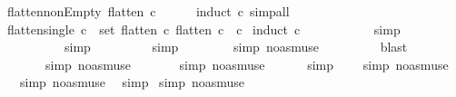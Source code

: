 \begin{isabellebody}
\isanewline
\isanewline
{}\isamarkupfalse%
\ flatten{\isacharunderscore}nonEmpty{\isacharcolon}\ {\isachardoublequoteopen}flatten\ c\ {\isasymnoteq}\ {\isacharbrackleft}{\isacharbrackright}{\isachardoublequoteclose}\isanewline
%
\isadelimproof
\ \ %
\endisadelimproof
%
\isatagproof
{}\isamarkupfalse%
\ {\isacharparenleft}induct\ c{\isacharparenright}\ simp{\isacharunderscore}all%
\endisatagproof
{\isafoldproof}%
%
\isadelimproof
\isanewline
%
\endisadelimproof
\isanewline
{}\isamarkupfalse%
\ flatten{\isacharunderscore}single{\isacharcolon}\ {\isachardoublequoteopen}{\isasymforall}c\ {\isasymin}\ set\ {\isacharparenleft}flatten\ c{\isacharprime}{\isacharparenright}{\isachardot}\ flatten\ c\ {\isacharequal}\ {\isacharbrackleft}c{\isacharbrackright}{\isachardoublequoteclose}\isanewline
%
\isadelimproof
%
\endisadelimproof
%
\isatagproof
{}\isamarkupfalse%
\ {\isacharparenleft}induct\ c{\isacharprime}{\isacharparenright}\isanewline
{}\isamarkupfalse%
\ \ \ \ \ \ \ \ \ \ \ simp\isanewline
{}\isamarkupfalse%
\ \ \ \ \ \ \ \ \ \ simp\isanewline
{}\isamarkupfalse%
\ \ \ \ \ \ \ \ \ simp\isanewline
{}\isamarkupfalse%
\ \ \ \ \ \ \ \ {\isacharparenleft}simp\ {\isacharparenleft}no{\isacharunderscore}asm{\isacharunderscore}use{\isacharparenright}\ {\isacharparenright}\isanewline
{}\isamarkupfalse%
\ \ \ \ \ \ \ \ blast\isanewline
{}\isamarkupfalse%
\ \ \ \ \ \ \ {\isacharparenleft}simp\ {\isacharparenleft}no{\isacharunderscore}asm{\isacharunderscore}use{\isacharparenright}\ {\isacharparenright}\isanewline
{}\isamarkupfalse%
\ \ \ \ \ \ {\isacharparenleft}simp\ {\isacharparenleft}no{\isacharunderscore}asm{\isacharunderscore}use{\isacharparenright}\ {\isacharparenright}\isanewline
{}\isamarkupfalse%
\ \ \ \ \ simp\isanewline
{}\isamarkupfalse%
\ \ \ \ {\isacharparenleft}simp\ {\isacharparenleft}no{\isacharunderscore}asm{\isacharunderscore}use{\isacharparenright}{\isacharparenright}\isanewline
{}\isamarkupfalse%
\ \ \ {\isacharparenleft}simp\ {\isacharparenleft}no{\isacharunderscore}asm{\isacharunderscore}use{\isacharparenright}{\isacharparenright}\isanewline
{}\isamarkupfalse%
\ \ simp\isanewline
{}\isamarkupfalse%
\ {\isacharparenleft}simp\ {\isacharparenleft}no{\isacharunderscore}asm{\isacharunderscore}use{\isacharparenright}{\isacharparenright}\isanewline
{}\isamarkupfalse%
%
\endisatagproof
{\isafoldproof}%

\end{isabellebody}
